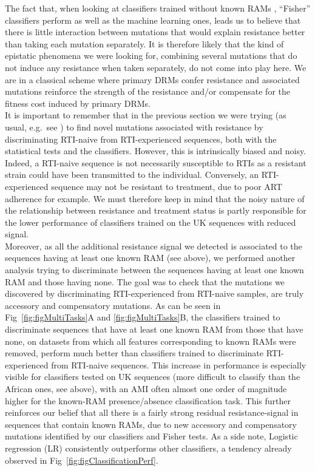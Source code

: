 \documentclass[
  11pt,
  twoside]{scrbook}
\begin{document}
The fact that, when looking at classifiers trained without known RAMs ,
``Fisher'' classifiers perform as well as the machine learning ones, leads
us to believe that there is little interaction between mutations that
would explain resistance better than taking each mutation separately. It
is therefore likely that the kind of epistatic phenomena we were looking
for, combining several mutations that do not induce any resistance when
taken separately, do not come into play here. We are in a classical
scheme where primary DRMs confer resistance and associated mutations
reinforce the strength of the resistance and/or compensate for the
fitness cost induced by primary DRMs.\\
It is important to remember that in the previous section we were trying
(as usual, e.g.~see \autocite{villabona-arenasIndepthAnalysisHIV12016}) to find
novel mutations associated with resistance by discriminating RTI-naive
from RTI-experienced sequences, both with the statistical tests and the
classifiers. However, this is intrinsically biased and noisy. Indeed, a
RTI-naive sequence is not necessarily susceptible to RTIs as a resistant
strain could have been transmitted to the individual. Conversely, an
RTI-experienced sequence may not be resistant to treatment, due to poor
ART adherence for example. We must therefore keep in mind that the noisy
nature of the relationship between resistance and treatment status is
partly responsible for the lower performance of classifiers trained on
the UK sequences with reduced signal.\\
Moreover, as all the additional resistance signal we detected is
associated to the sequences having at least one known RAM (see above),
we performed another analysis trying to discriminate between the
sequences having at least one known RAM and those having none. The goal
was to check that the mutations we discovered by discriminating
RTI-experienced from RTI-naive samples, are truly accessory and
compensatory mutations. As can be seen in
Fig~\ref{fig:figMultiTasks}A
and \ref{fig:figMultiTasks}B,
the classifiers trained to discriminate sequences that have at least one
known RAM from those that have none, on datasets from which all features
corresponding to known RAMs were removed, perform much better than
classifiers trained to discriminate RTI-experienced from RTI-naive
sequences. This increase in performance is especially visible for
classifiers tested on UK sequences (more difficult to classify than the
African ones, see above), with an AMI often almost one order of
magnitude higher for the known-RAM presence/absence classification task.
This further reinforces our belief that all there is a fairly strong
residual resistance-signal in sequences that contain known RAMs, due to
new accessory and compensatory mutations identified by our classifiers
and Fisher tests. As a side note, Logistic regression (LR) consistently
outperforms other classifiers, a tendency already observed in
Fig~\ref{fig:figClassificationPerf}.
\end{document}
